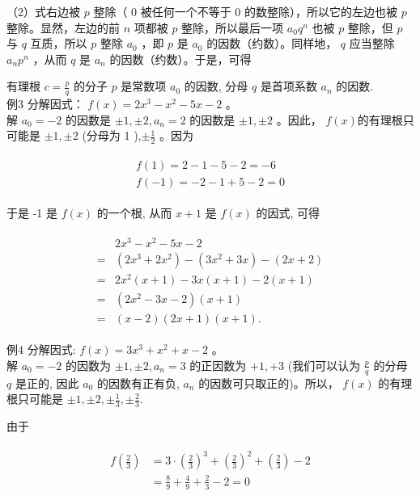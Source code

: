 \documentclass[10pt]{article}
\begin{document}
（2）式右边被 $p$ 整除（ 0 被任何一个不等于 0 的数整除），所以它的左边也被 $p$ 整除。显然，左边的前 $n$ 项都被 $p$ 整除，所以最后一项 $a_{0} q^{n}$ 也被 $p$ 整除，但 $p$ 与 $q$ 互质，所以 $p$ 整除 $a_{0}$ ，即 $p$ 是 $a_{0}$ 的因数（约数）。同样地， $q$ 应当整除 $a_{n} p^{n}$ ，从而 $q$ 是 $a_{n}$ 的因数（约数）。于是，可得

有理根 $c=\frac{p}{q}$ 的分子 $p$ 是常数项 $a_{0}$ 的因数, 分母 $q$ 是首项系数 $a_{n}$ 的因数.\\
例3 分解因式： $f(x)=2 x^{3}-x^{2}-5 x-2$ 。\\
解 $a_{0}=-2$ 的因数是 $\pm 1, \pm 2, a_{n}=2$ 的因数是 $\pm 1, \pm 2$ 。因此， $f(x)$的有理根只可能是 $\pm 1, \pm 2$ (分母为 1 ),$\pm \frac{1}{2}$ 。因为

\begin{align*}
\begin{gathered}
f(1)=2-1-5-2=-6 \\
f(-1)=-2-1+5-2=0
\end{gathered}
\end{align*}

于是 -1 是 $f(x)$ 的一个根, 从而 $x+1$ 是 $f(x)$ 的因式, 可得

\begin{align*}
\begin{aligned}
& 2 x^{3}-x^{2}-5 x-2 \\
= & \left(2 x^{3}+2 x^{2}\right)-\left(3 x^{2}+3 x\right)-(2 x+2) \\
= & 2 x^{2}(x+1)-3 x(x+1)-2(x+1) \\
= & \left(2 x^{2}-3 x-2\right)(x+1) \\
= & (x-2)(2 x+1)(x+1) .
\end{aligned}
\end{align*}

例4 分解因式: $f(x)=3 x^{3}+x^{2}+x-2$ 。\\
解 $a_{0}=-2$ 的因数为 $\pm 1, \pm 2, a_{n}=3$ 的正因数为 $+1,+3$ (我们可以认为 $\frac{p}{q}$ 的分母 $q$ 是正的, 因此 $a_{0}$ 的因数有正有负, $a_{n}$ 的因数可只取正的)。所以， $f(x)$ 的有理根只可能是 $\pm 1, \pm 2, \pm \frac{1}{3}, \pm \frac{2}{3}$.

由于

\begin{align*}
\begin{aligned}
f\left(\frac{2}{3}\right) & =3 \cdot\left(\frac{2}{3}\right)^{3}+\left(\frac{2}{3}\right)^{2}+\left(\frac{2}{3}\right)-2 \\
& =\frac{8}{9}+\frac{4}{9}+\frac{2}{3}-2=0
\end{aligned}
\end{align*}
\end{document}
